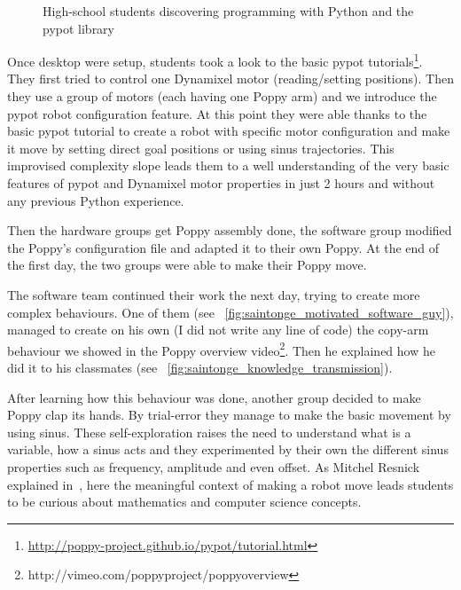 \begin{figure}[tb]
\centering
    \hfil
    \hfil
    \hfil
    \caption{High-school students discovering programming with Python and the pypot library}
    \label{fig:saintonge_software}
\end{figure}

Once desktop were setup, students took a look to the basic pypot tutorials\footnote{\url{http://poppy-project.github.io/pypot/tutorial.html}}. They first tried to control one Dynamixel motor (reading/setting positions). Then they use a group of motors (each having one Poppy arm) and we introduce the pypot robot configuration feature. At this point they were able thanks to the basic pypot tutorial to create a robot with specific motor configuration and make it move by setting direct goal positions or using sinus trajectories. This improvised complexity slope leads them to a well understanding of the very basic features of pypot and Dynamixel motor properties in just 2 hours and without any previous Python experience.

Then the hardware groups get Poppy assembly done, the software group modified the Poppy's configuration file and adapted it to their own Poppy. At the end of the first day, the two groups were able to make their Poppy move.

The software team continued their work the next day, trying to create more complex behaviours. One of them (see \figurename~\ref{fig:saintonge_motivated_software_guy}), managed to create on his own (I did not write any line of code) the copy-arm behaviour we showed in the Poppy overview video\footnote{http://vimeo.com/poppyproject/poppyoverview}. Then he explained how he did it to his classmates (see \figurename~\ref{fig:saintonge_knowledge_transmission}).

After learning how this behaviour was done, another group decided to make Poppy clap its hands. By trial-error they manage to make the basic movement by using sinus. These self-exploration raises the need to understand what is a variable, how a sinus acts and they experimented by their own the different sinus properties such as frequency, amplitude and even offset. As Mitchel Resnick explained in~\cite{resnick2009scratch}, here the meaningful context of making a robot move leads students to be curious about mathematics and computer science concepts.



